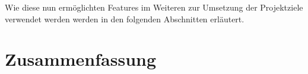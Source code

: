 \documentclass[11pt,twoside,a4paper]{article}
\begin{document}
Wie diese nun ermöglichten Features im Weiteren zur Umsetzung der Projektziele verwendet werden werden in den folgenden Abschnitten erläutert.





\section{Zusammenfassung}


\newpage

\printbibliography
\newpage

\appendix



%
%

%
%
%
\end{document}
